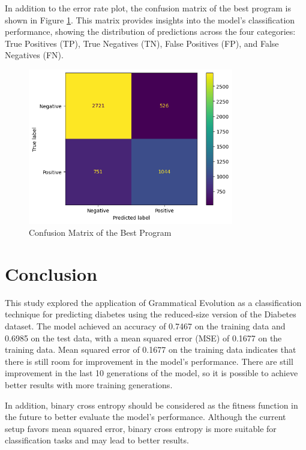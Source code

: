 \documentclass{article}
\begin{document}
In addition to the error rate plot, the confusion matrix of the best program is shown in Figure \ref{fig:confusion-matrix}. This matrix provides insights into the model's classification performance, showing the distribution of predictions across the four categories: True Positives (TP), True Negatives (TN), False Positives (FP), and False Negatives (FN).
\begin{figure}[h] 
    \centering 
    \includegraphics[width=0.8\textwidth]{./figures/confusion-matrix.png} 
    \caption{Confusion Matrix of the Best Program} 
    \label{fig:confusion-matrix}
\end{figure}



\section{Conclusion}
This study explored the application of Grammatical Evolution as a classification technique for predicting diabetes using the reduced-size version of the Diabetes dataset.
The model achieved an accuracy of 0.7467 on the training data and 0.6985 on the test data, with a mean squared error (MSE) of 0.1677 on the training data.
Mean squared error of 0.1677 on the training data indicates that there is still room for improvement in the model's performance.
There are still improvement in the last 10 generations of the model, so it is possible to achieve better results with more training generations.

In addition, binary cross entropy should be considered as the fitness function in the future to better evaluate the model's performance. 
Although the current setup favors mean squared error, binary cross entropy is more suitable for classification tasks and may lead to better results.
\end{document}
